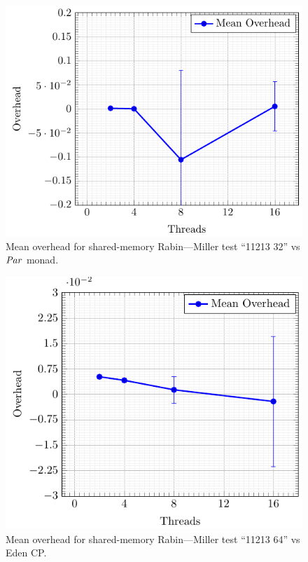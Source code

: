 \documentclass[paper=A4,twoside=true,openright,parskip=full,chapterprefix=true,headings=normal,bibliography=totoc,listof=totoc,titlepage=on,captions=tableabove,draft=false,british]{scrreprt}%
\renewcommand{\enquote}[1]{{``}#1{''}}
\begin{document}
\begin{figure}[h]
\centering
\includegraphics{src/img/overSMRM32Par.pdf}
\caption{Mean overhead for shared-memory Rabin---Miller test
\enquote{11213 32} vs \ensuremath{\Conid{Par}} monad.\label{fig:overSMRM32Par}}
\end{figure}

\begin{figure}[h]
\centering
\includegraphics{src/img/overSMRM64Eden.pdf}
\caption{Mean overhead for shared-memory Rabin---Miller test
\enquote{11213 64} vs Eden CP.\label{fig:overSMRM64Eden}}
\end{figure}
\end{document}
